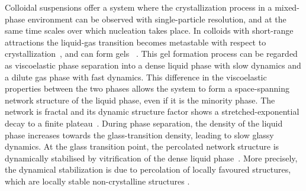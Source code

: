 \documentclass[preprint,amsmath,amssymb,superscriptaddress]{revtex4-1}
\begin{document}
Colloidal suspensions offer a system where the crystallization process in a mixed-phase environment can be observed with single-particle
resolution, and at the same time scales over which nucleation takes place. In colloids with short-range attractions the liquid-gas transition 
becomes metastable with respect to crystallization~\cite{anderson2002insights,lekkerkerker2011colloids}, and can form gels   
~\cite{poon2002,zaccarelli2007,piazza1994phase,verhaegh1997transient,lu2008gelation}. 
This gel formation process can be regarded as viscoelastic phase separation  \cite{tanaka1999colloid,tanaka2000viscoelastic} into a dense liquid phase with slow dynamics and a dilute gas phase with fast dynamics.  
This difference in the viscoelastic properties between the two phases allows the system to form a space-spanning 
network structure of the liquid phase, even if it is the minority phase. The network is fractal and its dynamic structure factor shows a stretched-exponential decay to a finite
plateau~\cite{krall1998internal,solomon2001dynamic,romer2000sol}. 
During phase separation, the density of the liquid phase increases towards the glass-transition density, leading to slow glassy dynamics.
At the glass transition point, the percolated network structure is dynamically stabilised by vitrification 
of the dense liquid phase~\cite{pusey1993dynamics,piazza1994phase,ilett1995phase,verhaegh1997transient,tanaka1999colloid,foffi2002,buzzaccaro2007sticky,zaccarelli2007,lu2008gelation,zaccarelli2008gelation,testard2011}.  
More precisely, the dynamical stabilization is due to percolation of locally favoured structures, which are locally stable non-crystalline structures \cite{royall2008g}.
\end{document}
